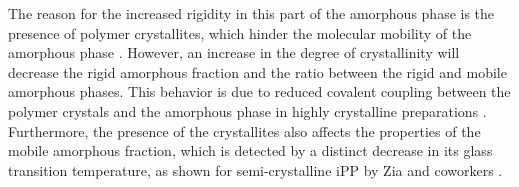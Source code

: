 The reason for the increased rigidity in this part of the amorphous phase is the presence of polymer crystallites, which hinder the molecular mobility of the amorphous phase \citep{ziaRigidAmorphousFraction2008, peacockHandbookPolyethyleneStructures2014}.
However, an increase in the degree of crystallinity will decrease the rigid amorphous fraction and the ratio between the rigid and mobile amorphous phases.
This behavior is due to reduced covalent coupling between the polymer crystals and the amorphous phase in highly crystalline preparations \citep{ziaRigidAmorphousFraction2008}.
Furthermore, the presence of the crystallites also affects the properties of the mobile amorphous fraction, which is detected by a distinct decrease in its glass transition temperature, as shown for semi-crystalline iPP by Zia and coworkers \citep{ziaRigidAmorphousFraction2008}.

